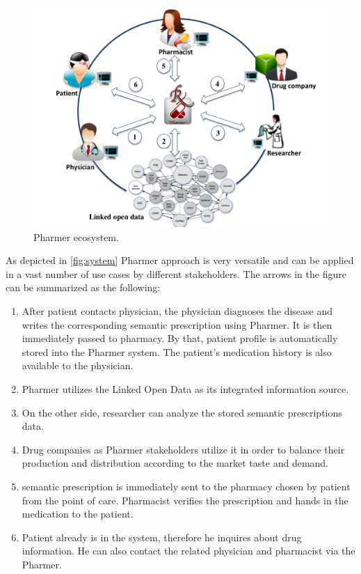\documentclass[10pt, conference, compsocconf]{IEEEtran}
\begin{document}
\begin{figure}[tb]
	\centering
		\includegraphics[width=1.0\columnwidth]{images/system.pdf}
	\caption{Pharmer ecosystem.}
	\label{fig:system}
\end{figure}

As depicted in \autoref{fig:system} Pharmer approach is very versatile and can be applied in a vast number of use cases by different stakeholders. The arrows in the figure can be summarized as the following:
\begin{enumerate}
\item After patient contacts physician, the physician diagnoses the disease and writes the corresponding semantic prescription using Pharmer. It is then immediately passed to pharmacy. By that, patient profile is automatically stored into the Pharmer system. The patient's medication history is also available to the physician.
\item Pharmer utilizes the Linked Open Data as its integrated information source.
\item On the other side, researcher can analyze the stored semantic prescriptions data.
\item Drug companies as Pharmer stakeholders utilize it in order to balance their production and distribution according to the market taste and demand.
\item semantic prescription is immediately sent to the pharmacy chosen by patient from the point of care. Pharmacist verifies the prescription and hands in the medication to the patient.
\item Patient already is in the system, therefore he inquires about drug information. He can also contact the related physician and pharmacist via the Pharmer.
\end{enumerate}
\end{document}
